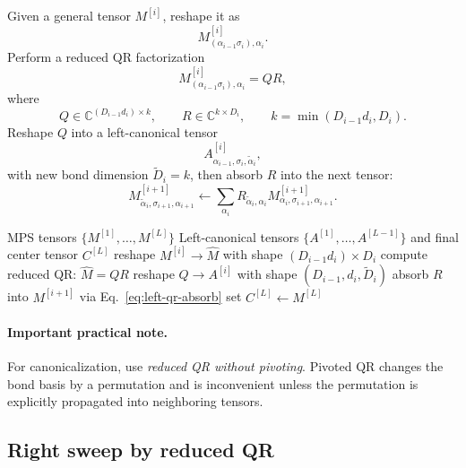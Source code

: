 \documentclass[aps,prb,onecolumn,nofootinbib]{revtex4-2}
\begin{document}
	Given a general tensor $M^{[i]}$, reshape it as
	\[
	M^{[i]}_{(\alpha_{i-1}\sigma_i),\alpha_i}.
	\]
	Perform a reduced QR factorization
	\begin{equation}
		M^{[i]}_{(\alpha_{i-1}\sigma_i),\alpha_i} = Q R,
	\end{equation}
	where
	\[
	Q\in \mathbb{C}^{(D_{i-1}d_i)\times k},\qquad
	R\in \mathbb{C}^{k\times D_i},\qquad
	k=\min(D_{i-1}d_i,D_i).
	\]
	Reshape $Q$ into a left-canonical tensor
	\[
	A^{[i]}_{\alpha_{i-1},\sigma_i,\tilde\alpha_i},
	\]
	with new bond dimension $\tilde D_i = k$, then absorb $R$ into the next tensor:
	\begin{equation}
		M^{[i+1]}_{\tilde\alpha_i,\sigma_{i+1},\alpha_{i+1}}
		\leftarrow
		\sum_{\alpha_i}
		R_{\tilde\alpha_i,\alpha_i}
		M^{[i+1]}_{\alpha_i,\sigma_{i+1},\alpha_{i+1}}.
		\label{eq:left-qr-absorb}
	\end{equation}
	
	\begin{algorithm}[H]
		\caption{LeftCanonicalizeByQR}
		\begin{algorithmic}[1]
			\Require MPS tensors $\{M^{[1]},\dots,M^{[L]}\}$
			\Ensure Left-canonical tensors $\{A^{[1]},\dots,A^{[L-1]}\}$ and final center tensor $C^{[L]}$
			\State reshape $M^{[i]} \to \hat M$ with shape $(D_{i-1}d_i)\times D_i$
			\State compute reduced QR: $\hat M = Q R$
			\State reshape $Q \to A^{[i]}$ with shape $(D_{i-1},d_i,\tilde D_i)$
			\State absorb $R$ into $M^{[i+1]}$ via Eq.~\eqref{eq:left-qr-absorb}
			\EndFor
			\State set $C^{[L]} \gets M^{[L]}$
		\end{algorithmic}
	\end{algorithm}
	
	\paragraph{Important practical note.}
	For canonicalization, use \emph{reduced QR without pivoting}. Pivoted QR changes the bond basis by a permutation and is inconvenient unless the permutation is explicitly propagated into neighboring tensors.
	
	\subsection{Right sweep by reduced QR}
	
\end{document}
